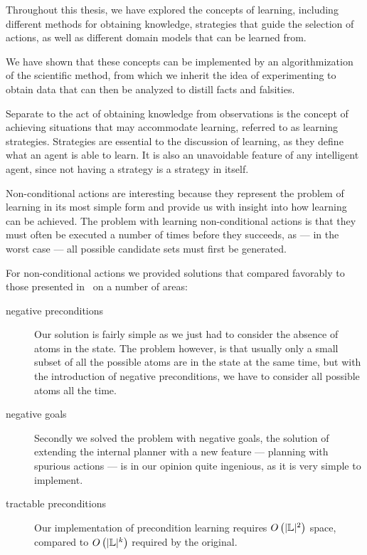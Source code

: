 \documentclass[Master.tex]{subfiles}
\begin{document}
Throughout this thesis, we have explored the concepts of learning, including different methods for obtaining knowledge, strategies that guide the selection of actions, as well as different domain models that can be learned from.

We have shown that these concepts can be implemented by an algorithmization of the scientific method, from which we inherit the idea of experimenting to obtain data that can then be analyzed to distill facts and falsities.

	Separate to the act of obtaining knowledge from observations is the concept of achieving situations that may accommodate learning, referred to as learning strategies.
	Strategies are essential to the discussion of learning, as they define what an agent is able to learn.
	It is also an unavoidable feature of any intelligent agent, since not having a strategy is a strategy in itself. 

	Non-conditional actions are interesting because they represent the problem of learning in its most simple form and provide us with insight into how learning can be achieved.
	The problem with learning non-conditional actions is that they must often be executed a number of times before they succeeds, as --- in the worst case --- all possible candidate sets must first be generated.
	
    For non-conditional actions we provided solutions that compared favorably to those presented in~\cite{Walsh2008} on a number of areas: 
\begin{description}
    \item[negative preconditions] Our solution is fairly simple as we just had to consider the absence of atoms in the state. The problem however, is that usually only a small subset of all the possible atoms are in the state at the same time, but with the introduction of negative preconditions, we have to consider all possible atoms all the time.
    \item[negative goals] Secondly we solved the problem with negative goals, the solution of extending the internal planner with a new feature --- planning with spurious actions --- is in our opinion quite ingenious, as it is very simple to implement. 
    \item[tractable preconditions] Our implementation of precondition learning requires $O\left(|\mathbb{L}|^2 \right)$ space, compared to $O\left(|\mathbb{L}|^k\right)$ required by the original.
\end{description}
	
\end{document}
